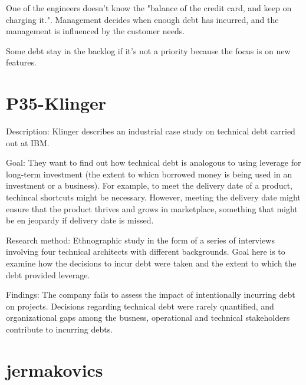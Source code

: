 One of the engineers doesn't know the "balance of the credit card, and keep on charging it.". Management decides when enough debt has incurred, and the management is influenced by the customer needs.

Some debt stay in the backlog if it's not a priority because the focus is on new features.

\section{P35-Klinger}
Description: Klinger describes an industrial case study on technical debt carried out at IBM.

Goal: They want to find out how technical debt is analogous to using leverage for long-term investment (the extent to whicn borrowed money is being used in an investment or a business). For example, to meet the delivery date of a product, techincal shortcuts might be necessary. However, meeting the delivery date might ensure that the product thrives and grows in marketplace, something that might be en jeopardy if delivery date is missed. 

Research method: Ethnographic study in the form of a series of interviews involving four technical architects with different backgrounds. Goal here is to examine how the decisions to incur debt were taken and the extent to which the debt provided leverage.

Findings: The company fails to assess the impact of intentionally incurring debt on projects. Decisions regarding technical debt were rarely quantified, and organizational gaps among the busness, operational and technical stakeholders contribute to incurring debts.




\section{jermakovics}